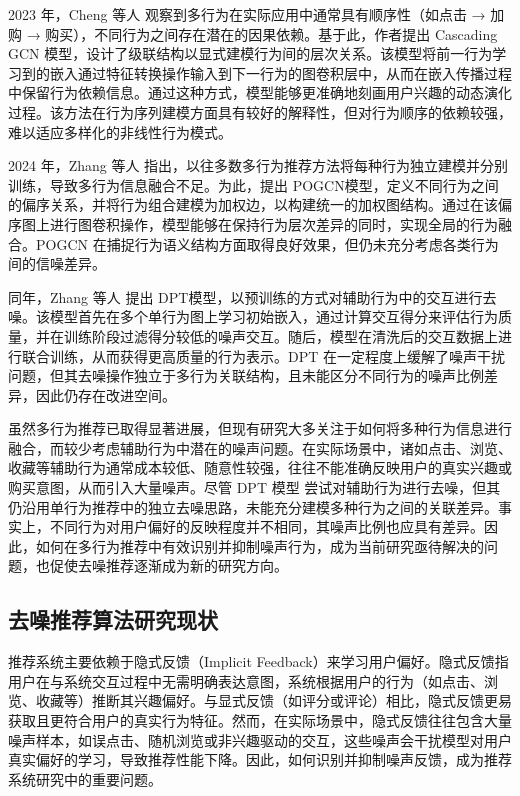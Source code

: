 2023 年，Cheng 等人 \cite{cheng2023cascading} 观察到多行为在实际应用中通常具有顺序性（如点击 → 加购 → 购买），不同行为之间存在潜在的因果依赖。基于此，作者提出 Cascading GCN 模型，设计了级联结构以显式建模行为间的层次关系。该模型将前一行为学习到的嵌入通过特征转换操作输入到下一行为的图卷积层中，从而在嵌入传播过程中保留行为依赖信息。通过这种方式，模型能够更准确地刻画用户兴趣的动态演化过程。该方法在行为序列建模方面具有较好的解释性，但对行为顺序的依赖较强，难以适应多样化的非线性行为模式。

2024 年，Zhang 等人 \cite{zhang2024POGCN} 指出，以往多数多行为推荐方法将每种行为独立建模并分别训练，导致多行为信息融合不足。为此，提出 POGCN模型，定义不同行为之间的偏序关系，并将行为组合建模为加权边，以构建统一的加权图结构。通过在该偏序图上进行图卷积操作，模型能够在保持行为层次差异的同时，实现全局的行为融合。POGCN 在捕捉行为语义结构方面取得良好效果，但仍未充分考虑各类行为间的信噪差异。

同年，Zhang 等人 \cite{zhang2023DPT} 提出 DPT模型，以预训练的方式对辅助行为中的交互进行去噪。该模型首先在多个单行为图上学习初始嵌入，通过计算交互得分来评估行为质量，并在训练阶段过滤得分较低的噪声交互。随后，模型在清洗后的交互数据上进行联合训练，从而获得更高质量的行为表示。DPT 在一定程度上缓解了噪声干扰问题，但其去噪操作独立于多行为关联结构，且未能区分不同行为的噪声比例差异，因此仍存在改进空间。

虽然多行为推荐已取得显著进展，但现有研究大多关注于如何将多种行为信息进行融合，而较少考虑辅助行为中潜在的噪声问题。在实际场景中，诸如点击、浏览、收藏等辅助行为通常成本较低、随意性较强，往往不能准确反映用户的真实兴趣或购买意图，从而引入大量噪声。尽管 DPT 模型\cite{zhang2023DPT} 尝试对辅助行为进行去噪，但其仍沿用单行为推荐中的独立去噪思路，未能充分建模多种行为之间的关联差异。事实上，不同行为对用户偏好的反映程度并不相同，其噪声比例也应具有差异。因此，如何在多行为推荐中有效识别并抑制噪声行为，成为当前研究亟待解决的问题，也促使去噪推荐逐渐成为新的研究方向。

\subsection{去噪推荐算法研究现状}
推荐系统主要依赖于隐式反馈（Implicit Feedback）来学习用户偏好。隐式反馈指用户在与系统交互过程中无需明确表达意图，系统根据用户的行为（如点击、浏览、收藏等）推断其兴趣偏好。与显式反馈（如评分或评论）相比，隐式反馈更易获取且更符合用户的真实行为特征。然而，在实际场景中，隐式反馈往往包含大量噪声样本，如误点击、随机浏览或非兴趣驱动的交互，这些噪声会干扰模型对用户真实偏好的学习，导致推荐性能下降。因此，如何识别并抑制噪声反馈，成为推荐系统研究中的重要问题\cite{JSJY2024S1014}。

